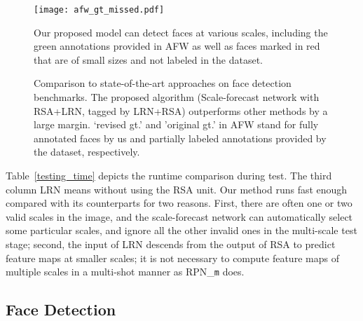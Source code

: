 \documentclass[10pt,twocolumn,letterpaper]{article}
\begin{document}
\begin{figure*}[ht!]
	\begin{center}
		\texttt{[image: afw\_gt\_missed.pdf]}
	\end{center}
	\vspace{-.2cm}
	\caption{Our proposed model can detect faces at various scales, including the green annotations provided in AFW \cite{Zhu2012Face} as well as faces marked in red that are of small sizes and not labeled in the dataset.}
	\label{afw_gt_missed}
\end{figure*}


\begin{figure*}
	\centering 
	\caption{Comparison to state-of-the-art approaches on face detection benchmarks. 
		The proposed algorithm (Scale-forecast network with RSA+LRN, tagged by LRN+RSA) outperforms other methods by a large margin.
`revised gt.' and 'original gt.' in AFW stand for fully annotated faces by us and partially labeled annotations provided by the dataset, respectively.
}  
	\label{com_to_soa}
\end{figure*}



Table~\ref{testing_time} depicts the runtime comparison during test. 
The third column LRN means without using the RSA unit.
Our method runs fast enough compared with its counterparts for two reasons. First, there are often one or two valid scales in the image, and the scale-forecast network can automatically select some particular scales, and ignore all the other invalid ones in the multi-scale test stage; 
second, the input of LRN descends from the output of RSA to predict feature maps at smaller scales; it is not necessary to compute feature maps of multiple scales in a multi-shot manner as RPN\_\texttt{m} does.

\subsection{Face Detection}
\label{state_of_the_art}
\end{document}
